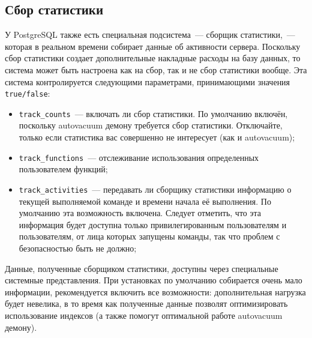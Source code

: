 \subsection{Сбор статистики}


У PostgreSQL также есть специальная подсистема~--- сборщик статистики,~--- которая в реальном времени собирает данные об активности сервера. Поскольку сбор статистики создает дополнительные накладные расходы на базу данных, то система может быть настроена как на сбор, так и не сбор статистики вообще. Эта система контролируется следующими параметрами, принимающими значения \lstinline!true/false!:

\begin{itemize}
  \item \lstinline!track_counts!~--- включать ли сбор статистики. По умолчанию включён, поскольку autovacuum демону требуется сбор статистики. Отключайте, только если статистика вас совершенно не интересует (как и autovacuum);
  \item \lstinline!track_functions!~--- отслеживание использования определенных пользователем функций;
  \item \lstinline!track_activities!~--- передавать ли сборщику статистики информацию о текущей выполняемой команде и времени начала её выполнения. По умолчанию эта возможность включена. Следует отметить, что эта информация будет доступна только привилегированным пользователям и пользователям, от лица которых запущены команды, так что проблем с безопасностью быть не должно;
\end{itemize}

Данные, полученные сборщиком статистики, доступны через специальные системные представления. При установках по умолчанию собирается очень мало информации, рекомендуется включить все возможности: дополнительная нагрузка будет невелика, в то время как полученные данные позволят оптимизировать использование индексов (а также помогут оптимальной работе autovacuum демону).